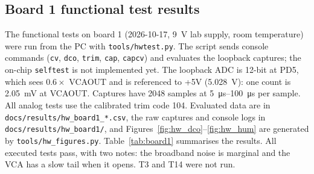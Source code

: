 \documentclass[11pt,a4paper]{article}
\newcommand{\file}[1]{\texttt{#1}}
\begin{document}
\subsection{Board 1 functional test results}\label{sec:board1}
The functional tests on board 1 (2026-10-17, \SI{9}{V} lab supply, room temperature) were run from the PC
with \file{tools/hwtest.py}. The script sends console commands (\texttt{cv}, \texttt{dco}, \texttt{trim},
\texttt{cap}, \texttt{capcv}) and evaluates the loopback captures; the on-chip \texttt{selftest} is not
implemented yet. The loopback ADC is 12-bit at PD5, which sees $0.6\times$ VCAOUT and is referenced to +5V
(\SI{5.028}{V}): one count is \SI{2.05}{mV} at VCAOUT. Captures have 2048 samples at
\SIrange{5}{100}{\micro s} per sample. All analog tests use the calibrated trim code 104. Evaluated data are in
\file{docs/results/hw\_board1\_*.csv}, the raw captures and console logs in \file{docs/results/hw\_board1/},
and Figures~\ref{fig:hw_dco}--\ref{fig:hw_hum} are generated by \file{tools/hw\_figures.py}.
Table~\ref{tab:board1} summarises the results. All executed tests pass, with two notes: the broadband noise
is marginal and the VCA has a slow tail when it opens. T3 and T14 were not run.
\end{document}

